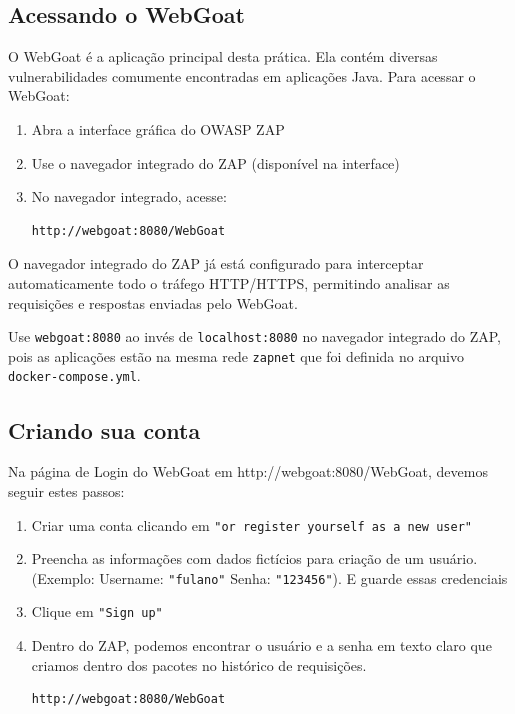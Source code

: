 \documentclass[11pt]{ifscarticle}
\begin{document}
\subsection{Acessando o WebGoat}

O WebGoat é a aplicação principal desta prática. Ela contém diversas vulnerabilidades comumente encontradas em aplicações Java. Para acessar o WebGoat:

\begin{enumerate}
    \item Abra a interface gráfica do OWASP ZAP
    \item Use o navegador integrado do ZAP (disponível na interface)
    \item No navegador integrado, acesse:
\begin{lstlisting}[style=shell]
http://webgoat:8080/WebGoat
\end{lstlisting}
\end{enumerate}
O navegador integrado do ZAP já está configurado para interceptar automaticamente todo o tráfego HTTP/HTTPS, permitindo analisar as requisições e respostas enviadas pelo WebGoat.

\begin{important}
    Use \texttt{webgoat:8080} ao invés de \texttt{localhost:8080} no navegador integrado do ZAP, pois as aplicações estão na mesma rede \texttt{zapnet} que foi definida no arquivo \texttt{docker-compose.yml}.
\end{important}    

\subsection{Criando sua conta}

Na página de Login do WebGoat em http://webgoat:8080/WebGoat, devemos seguir estes passos:

\begin{enumerate}
    \item Criar uma conta clicando em \texttt{"or register yourself as a new user"}
    \item Preencha as informações com dados fictícios para criação de um usuário. (Exemplo: Username: \texttt{"fulano"} Senha: \texttt{"123456"}). E guarde essas credenciais 
    \item Clique em \texttt{"Sign up"}
    \item Dentro do ZAP, podemos encontrar o usuário e a senha em texto claro que criamos dentro dos pacotes no histórico de requisições.
\begin{lstlisting}[style=shell]
http://webgoat:8080/WebGoat
\end{lstlisting}
\end{enumerate}
\end{document}

